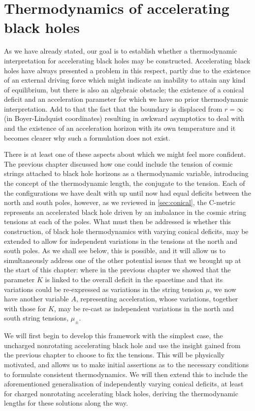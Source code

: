 \documentclass[
twoside,
openright,
frontopenright,
]{dmathesis}
\begin{document}
\chapter{Thermodynamics of accelerating black holes}
\label{cha:therm-accel-black}

As we have already stated, our goal is to establish whether a thermodynamic
interpretation for accelerating black holes may be constructed. Accelerating
black holes have always presented a problem in this respect, partly due to the
existence of an external driving force which might indicate an inability to
attain any kind of equilibrium, but there is also an algebraic obstacle; the
existence of a conical deficit and an acceleration parameter for which we have
no prior thermodynamic interpretation. Add to that the fact that the boundary is
displaced from $r = \infty$ (in Boyer-Lindquist coordinates) resulting in
awkward asymptotics to deal with and the existence of an acceleration horizon
with its own temperature and it becomes clearer why such a formulation does not
exist.

There is at least one of these aspects about which we might feel more
confident. The previous chapter discussed how one could include the tension of
cosmic strings attached to black hole horizons as a thermodynamic variable,
introducing the concept of the thermodynamic length, the conjugate to the
tension. Each of the configurations we have dealt with up until now had equal
deficits between the north and south poles, however, as we reviewed in
\cref{sec:conical}, the C-metric represents an accelerated black hole driven by
an imbalance in the cosmic string tensions at each of the poles. What must then
be addressed is whether this construction, of black hole thermodynamics with
varying conical deficits, may be extended to allow for independent variations in
the tensions at the north and south poles. As we shall see below, this is
possible, and it will allow us to simultaneously address one of the other
potential issues that we brought up at the start of this chapter: where in the
previous chapter we showed that the parameter $K$ is linked to the overall
deficit in the spacetime and that its variations could be re-expressed as
variations in the string tension $\mu$, we now have another variable $A$,
representing acceleration, whose variations, together with those for $K$, may be
re-cast as independent variations in the north and south string tensions,
$\mu_\pm$.

We will first begin to develop this framework with the simplest case, the
uncharged nonrotating accelerating black hole and use the insight gained from
the previous chapter to choose to fix the tensions. This will be physically
motivated, and allows us to make initial assertions as to the necessary
conditions to formulate consistent thermodynamics. We will then extend this
to include the aforementioned generalisation of independently varying conical
deficits, at least for charged nonrotating accelerating black holes, deriving
the thermodynamic lengths for these solutions along the way.
\end{document}
